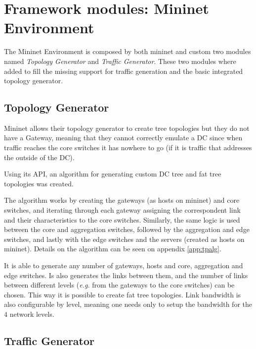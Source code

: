 \documentclass[12pt,english,oneside]{book}
\begin{document}
\section{Framework modules: Mininet Environment}
\hspace{0.6cm}

The Mininet Environment is composed by both mininet and custom two modules named \textit{Topology Generator} and \textit{Traffic Generator}.
These two modules where added to fill the missing support for traffic generation and the basic integrated topology generator.

\subsection{Topology Generator}
\hspace{0.6cm}

Mininet allows their topology generator to create tree topologies but they do not have a Gateway, meaning that they cannot correctly emulate a DC since when traffic reaches the core switches it has nowhere to go (if it is traffic that addresses the outside of the DC).

Using its API, an algorithm for generating custom DC tree and fat tree topologies was created.

The algorithm works by creating the gateways (as hosts on mininet) and core switches, and iterating through each gateway assigning the correspondent link and their characteristics to the core switches. Similarly, the same logic is used between the core and aggregation switches, followed by the aggregation and edge switches, and lastly with the edge switches and the servers (created as hosts on mininet).
Details on the algorithm can be seen on appendix \ref{app:tpalg}.

It is able to generate any number of gateways, hosts and core, aggregation and edge switches.
Is also generates the links between them, and the number of links between different levels (\textit{e.g.} from the gateways to the core switches) can be chosen. This way it is possible to create fat tree topologies.
Link bandwidth is also configurable by level, meaning one needs only to setup the bandwidth for the $4$ network levels.

\subsection{Traffic Generator}
\hspace{0.6cm}
\end{document}
